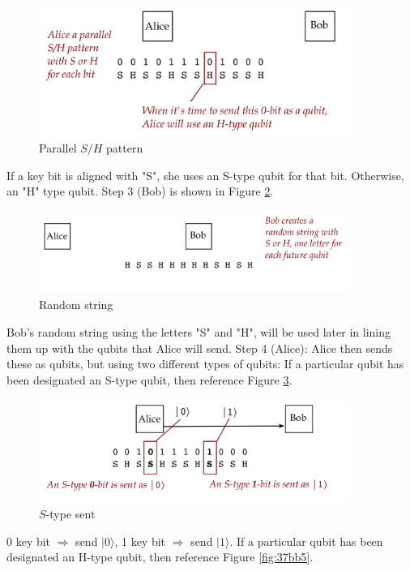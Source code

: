 \documentclass[main.tex]{subfiles}
\begin{document}
    \begin{figure}
        \centering
        \includegraphics[width=4in]{notes/figs/n05/34bb3.png}
        \caption{Parallel $S/H$ pattern}
        \label{fig:34bb3}
    \end{figure}
    
    If a key bit is aligned with "S", she uses an S-type qubit for that bit. Otherwise, an "H" type qubit. Step 3 (Bob) is shown in Figure \ref{fig:35bb3a}.
    
    \begin{figure}
        \centering
        \includegraphics[width=4in]{notes/figs/n05/35bb3a.png}
        \caption{Random string}
        \label{fig:35bb3a}
    \end{figure}
   
   Bob's random string using the letters "S" and "H", will be used later in lining them up with the qubits that Alice will send. Step 4 (Alice): Alice then sends these as qubits, but using two different types of qubits: If a particular qubit has been designated an S-type qubit, then reference Figure \ref{fig:36bb4}.
   
    \begin{figure}
        \centering
        \includegraphics[width=4in]{notes/figs/n05/36bb4.png}
        \caption{$S$-type sent}
        \label{fig:36bb4}
    \end{figure}
    
    0 key bit $\Rightarrow$ send $|0\rangle$, 1 key bit $\Rightarrow$ send $|1\rangle$. If a particular qubit has been designated an H-type qubit, then reference Figure \ref{fig:37bb5}.
    
\end{document}
